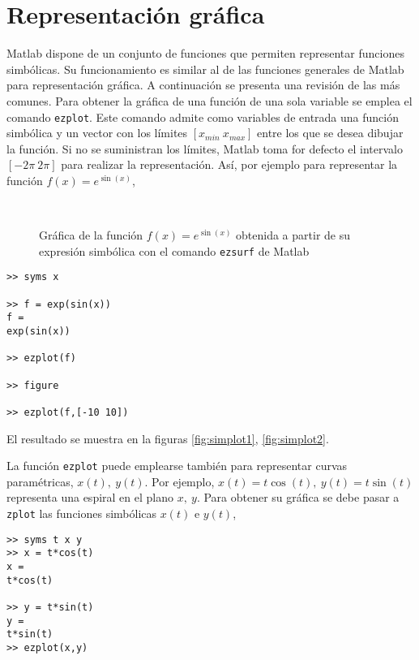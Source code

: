 \section{Representación gráfica}
Matlab dispone de un conjunto de funciones que permiten representar funciones simbólicas. Su funcionamiento es similar al de las funciones generales de Matlab para representación gráfica. A continuación se presenta una revisión de las más comunes.
Para obtener la gráfica de una función de una sola variable se emplea el comando \texttt{ezplot}. Este comando admite como variables de entrada una función simbólica y un vector con los límites $[x_{min}\ x_{max}]$ entre los que se desea dibujar la función. Si no se suministran los límites, Matlab toma for defecto el intervalo $[-2\pi \ 2\pi]$ para realizar la representación. Así, por ejemplo para representar la función $f(x) = e^{\sin(x)}$,

\begin{figure}
\centering
{} \qquad 
{}\\
\caption{Gráfica de la función $f(x) = e^{\sin\left(x\right)}$ obtenida a partir de su expresión simbólica con el comando \texttt{ezsurf} de Matlab}
\end{figure}

\begin{verbatim}
>> syms x

>> f = exp(sin(x)) 
f = 
exp(sin(x))
  
>> ezplot(f)

>> figure

>> ezplot(f,[-10 10])
\end{verbatim}
El resultado se muestra en la figuras \ref{fig:simplot1}, \ref{fig:simplot2}. 

La función \texttt{ezplot} puede emplearse también para representar curvas paramétricas, $x(t),\ y(t)$. Por ejemplo, $x(t) = t\cos(t),\  y(t)= t\sin(t)$ representa una espiral en el plano $x,\ y$. Para obtener su gráfica se debe pasar a \texttt{zplot} las funciones simbólicas $x(t)$ e $y(t)$,
\begin{verbatim}
>> syms t x y
>> x = t*cos(t)
x = 
t*cos(t)
 
>> y = t*sin(t) 
y = 
t*sin(t) 
>> ezplot(x,y)
\end{verbatim}

